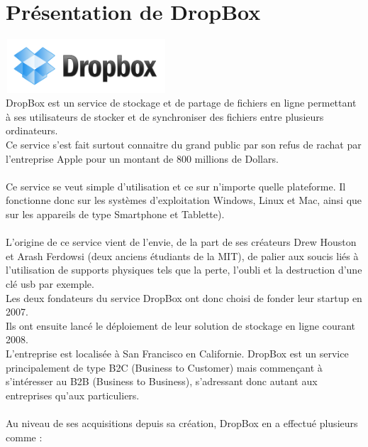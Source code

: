 \documentclass[a4paper, 10pt]{article}
\begin{document}
\section*{Pr\'esentation de DropBox}
\includegraphics[height = 2cm, width = 6cm]{dropbox_logo.png}\\
DropBox est un service de stockage et de partage de fichiers en ligne permettant \`a ses utilisateurs de stocker et
de synchroniser des fichiers entre plusieurs ordinateurs.\\
Ce service s'est fait surtout connaitre du grand public par son refus de rachat
par l'entreprise Apple pour un montant de 800 millions de Dollars.\\ \\
Ce service se veut simple d'utilisation et ce sur n'importe quelle plateforme.
Il fonctionne donc sur les syst\`emes d'exploitation Windows, Linux et Mac, ainsi que sur les appareils de type Smartphone et Tablette).\\ \\
L'origine de ce service vient de l'envie, de la part de ses cr\'eateurs Drew Houston et Arash Ferdowsi (deux anciens \'etudiants de la MIT),
de palier aux soucis li\'es \`a l'utilisation de supports physiques tels que la perte, l'oubli et la destruction d'une cl\'e usb par exemple.\\
Les deux fondateurs du service DropBox ont donc choisi de fonder leur startup en 2007.\\
Ils ont ensuite lanc\'e le d\'eploiement de leur solution de stockage en ligne courant 2008.\\
L'entreprise est localis\'ee \`a San Francisco en Californie.
\newpage
\noindent
DropBox est un service principalement de type B2C (Business to Customer) mais commençant \`a s'int\'eresser au B2B (Business to Business),
s'adressant donc autant aux entreprises qu'aux particuliers.\\ \\
Au niveau de ses acquisitions depuis sa cr\'eation, DropBox en a effectu\'e plusieurs comme :
\end{document}
